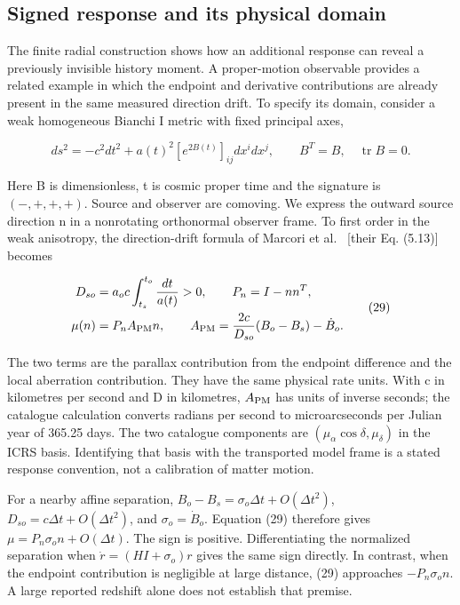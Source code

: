 \documentclass[aps,prd,preprint,onecolumn,notitlepage]{revtex4-2}
\begin{document}
\hypertarget{signed-response-and-its-physical-domain}{%
\subsection{Signed response and its physical domain}\label{signed-response-and-its-physical-domain}}

The finite radial construction shows how an additional response can reveal a previously invisible history moment. A proper-motion observable provides a related example in which the endpoint and derivative contributions are already present in the same measured direction drift. To specify its domain, consider a weak homogeneous Bianchi I metric with fixed principal axes,

\[
ds^2=-c^2dt^2+a(t)^2[e^{2B(t)}]_{ij}dx^i dx^j,
\qquad B^T=B,\quad \operatorname{tr}B=0.
\tag{28}
\]

Here B is dimensionless, t is cosmic proper time and the signature is \((- ,+,+,+)\). Source and observer are comoving. We express the outward source direction n in a nonrotating orthonormal observer frame. To first order in the weak anisotropy, the direction-drift formula of Marcori et al.~\cite{Marcori2018} {[}their Eq. (5.13){]} becomes

\[
\begin{aligned}
D_{so}&=a_o c\int_{t_s}^{t_o}\frac{dt}{a(t)}>0,\qquad
P_n=I-nn^T,\\
\mu(n)&=P_n A_{\rm PM}n,\qquad
A_{\rm PM}=\frac{2c}{D_{so}}(B_o-B_s)-\dot B_o.
\end{aligned}
\tag{29}
\]

The two terms are the parallax contribution from the endpoint difference and the local aberration contribution. They have the same physical rate units. With c in kilometres per second and D in kilometres, \(A_{\rm PM}\) has units of inverse seconds; the catalogue calculation converts radians per second to microarcseconds per Julian year of 365.25 days. The two catalogue components are \((\mu_\alpha\cos\delta,\mu_\delta)\) in the ICRS basis. Identifying that basis with the transported model frame is a stated response convention, not a calibration of matter motion.

For a nearby affine separation, \(B_o-B_s=\sigma_o\Delta t+O(\Delta t^2)\), \(D_{so}=c\Delta t+O(\Delta t^2)\), and \(\sigma_o=\dot B_o\). Equation (29) therefore gives \(\mu=P_n\sigma_o n+O(\Delta t)\). The sign is positive. Differentiating the normalized separation when \(\dot r=(H I+\sigma_o)r\) gives the same sign directly. In contrast, when the endpoint contribution is negligible at large distance, (29) approaches \(-P_n\sigma_o n\). A large reported redshift alone does not establish that premise.
\end{document}
